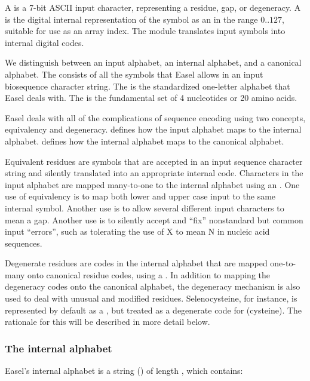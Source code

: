 A  is a 7-bit ASCII input character, representing a
residue, gap, or degeneracy. A  is the digital internal
representation of the symbol as an  in the range
$0..127$, suitable for use as an array index. The 
module translates input symbols into internal digital codes.

We distinguish between an input alphabet, an internal alphabet, and a
canonical alphabet.  The  consists of all the
symbols that Easel allows in an input biosequence character
string. The  is the standardized one-letter
alphabet that Easel deals with. The  is the
fundamental set of 4 nucleotides or 20 amino acids.

Easel deals with all of the complications of sequence encoding using
two concepts, equivalency and degeneracy.  
defines how the input alphabet maps to the internal
alphabet.  defines how the internal alphabet maps
to the canonical alphabet.

Equivalent residues are symbols that are accepted in an input sequence
character string and silently translated into an appropriate internal
code. Characters in the input alphabet are mapped many-to-one to the
internal alphabet using an . One use of equivalency
is to map both lower and upper case input to the same internal
symbol. Another use is to allow several different input characters to
mean a gap. Another use is to silently accept and ``fix'' nonstandard
but common input ``errors'', such as tolerating the use of X to mean N
in nucleic acid sequences.

Degenerate residues are codes in the internal alphabet that are mapped
one-to-many onto canonical residue codes, using a . In addition to mapping the degeneracy codes onto the canonical
alphabet, the degeneracy mechanism is also used to deal with unusual
and modified residues. Selenocysteine, for instance, is represented by
default as a , but treated as a degenerate code for 
(cysteine). The rationale for this will be described in more detail
below.

\subsubsection{The internal alphabet}

Easel's internal alphabet is a string () of length
, which contains:

